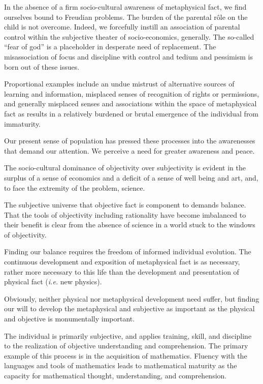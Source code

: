 \vfill
\break

﻿In the absence of a firm socio-cultural awareness of metaphysical
fact, we find ourselves bound to Freudian problems.  The burden of the
parental r\^{o}le on the child is not overcome.  Indeed, we forcefully
instill an association of parental control within the subjective
theater of socio-economics, generally.  The so-called ``fear of god''
is a placeholder in desperate need of replacement.  The misassociation
of focus and discipline with control and tedium and pessimism is born
out of these issues.

Proportional examples include an undue mistrust of alternative sources
of learning and information, misplaced senses of recognition of rights
or permissions, and generally misplaced senses and associations within
the space of metaphysical fact as results in a relatively burdened or
brutal emergence of the individual from immaturity.

Our present sense of population has pressed these processes into the
awarenesses that demand our attention.  We perceive a need for greater
awareness and peace.

The socio-cultural dominance of objectivity over subjectivity is
evident in the surplus of a sense of economics and a deficit of a
sense of well being and art, and, to face the extremity of the
problem, science.

The subjective universe that objective fact is component to demands
balance.  That the tools of objectivity including rationality have
become imbalanced to their benefit is clear from the absence of
science in a world stuck to the windows of objectivity.

Finding our balance requires the freedom of \break informed individual
evolution.  The continuous development and exposition of metaphysical
fact is as necessary, rather more necessary to this life than the
development and presentation of physical fact ({\it i.e.} new
physics).

Obviously, neither physical nor metaphysical development need suffer,
but finding our will to develop the metaphysical and subjective as
important as the physical and objective is monumentally important.

\vfill
\break

﻿The individual is primarily subjective, and applies training, skill,
and discipline to the realization of objective understanding and
comprehension.  The primary example of this process is in the
acquisition of mathematics.  Fluency with the languages and tools of
mathematics leads to mathematical maturity as the capacity for
mathematical thought, understanding, and comprehension.

